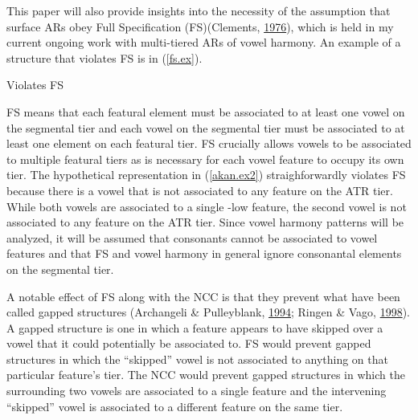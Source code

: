 \documentclass[,doc,floatsintext]{apa6}
\theoremstyle{definition}
\theoremstyle{definition}
\theoremstyle{definition}
\theoremstyle{remark}
\begin{document}
This paper will also provide insights into the necessity of the
assumption that surface ARs obey Full Specification (FS)(Clements,
\protect\hyperlink{ref-Clements1976}{1976}), which is held in my current
ongoing work with multi-tiered ARs of vowel harmony. An example of a
structure that violates FS is in (\ref{fs.ex}).

\begin{exe}
\ex \label{akan.ex2} Violates FS
\end{exe}

FS means that each featural element must be associated to at least one
vowel on the segmental tier and each vowel on the segmental tier must be
associated to at least one element on each featural tier. FS crucially
allows vowels to be associated to multiple featural tiers as is
necessary for each vowel feature to occupy its own tier. The
hypothetical representation in (\ref{akan.ex2}) straighforwardly
violates FS because there is a vowel that is not associated to any
feature on the ATR tier. While both vowels are associated to a single
-low feature, the second vowel is not associated to any feature on the
ATR tier. Since vowel harmony patterns will be analyzed, it will be
assumed that consonants cannot be associated to vowel features and that
FS and vowel harmony in general ignore consonantal elements on the
segmental tier.

A notable effect of FS along with the NCC is that they prevent what have
been called gapped structures (Archangeli \& Pulleyblank,
\protect\hyperlink{ref-archangelipulleyblank1994}{1994}; Ringen \& Vago,
\protect\hyperlink{ref-ringenvago1998}{1998}). A gapped structure is one
in which a feature appears to have skipped over a vowel that it could
potentially be associated to. FS would prevent gapped structures in
which the \enquote{skipped} vowel is not associated to anything on that
particular feature's tier. The NCC would prevent gapped structures in
which the surrounding two vowels are associated to a single feature and
the intervening \enquote{skipped} vowel is associated to a different
feature on the same tier.
\end{document}
